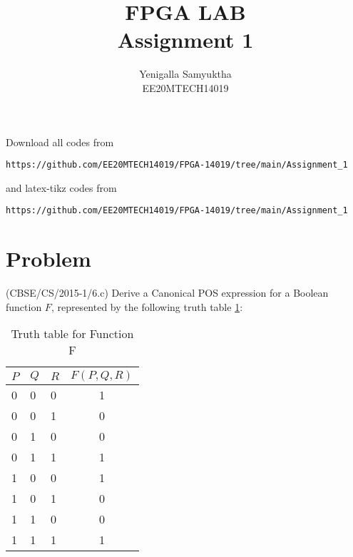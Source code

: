 \documentclass[journal,12pt,twocolumn]{IEEEtran}
\begin{document}
     \def\rightbox#1{\makebox[0in][r]{#1}}
     \def\centbox#1{\makebox[0in]{#1}}
     \def\topbox#1{\raisebox{-\baselineskip}[0in][0in]{#1}}
     \def\midbox#1{\raisebox{-0.5\baselineskip}[0in][0in]{#1}}
\vspace{3cm}
\title{FPGA LAB \\ Assignment 1}
\author{Yenigalla Samyuktha \\ EE20MTECH14019}
\maketitle
\newpage
\bigskip
\renewcommand{\thefigure}{\theenumi}
\renewcommand{\thetable}{\theenumi}
\noindent Download all codes from 
\begin{lstlisting}
https://github.com/EE20MTECH14019/FPGA-14019/tree/main/Assignment_1
\end{lstlisting}
%
and latex-tikz codes from 
%
\begin{lstlisting}
https://github.com/EE20MTECH14019/FPGA-14019/tree/main/Assignment_1
\end{lstlisting}
\section{Problem}
\noindent(CBSE/CS/2015-1/6.c) Derive a Canonical POS expression for a Boolean function $F$, represented by the following truth table \ref{tt}:
\begin{table}[h!]
\centering
\begin{tabular}{|l|l|l|c|} 
\hline
$P$ & $Q$ & $R$ & $F(P,Q,R)$  \\ 
\hline
0 & 0 & 0 & 1         \\ 
\hline
0 & 0 & 1 & 0         \\ 
\hline
0 & 1 & 0 & 0         \\ 
\hline
0 & 1 & 1 & 1         \\ 
\hline
1 & 0 & 0 & 1         \\ 
\hline
1 & 0 & 1 & 0         \\ 
\hline
1 & 1 & 0 & 0         \\ 
\hline
1 & 1 & 1 & 1         \\
\hline
\end{tabular}
\caption{Truth table for Function F}
\label{tt}
\vspace{-8mm}
\end{table}
\end{document}
